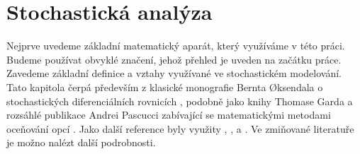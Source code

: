 \documentclass[a4paper,12pt]{report}
\theoremstyle{definition} \newtheorem{definice}[veta]{Definice}
\theoremstyle{remark}
\begin{document}

\chapter{Stochastická analýza}
Nejprve uvedeme základní matematický aparát, který využíváme v této práci.
Budeme používat obvyklé značení, jehož přehled je uveden na začátku práce. 
Zavedeme základní definice a vztahy využívané ve stochastickém modelování.
Tato kapitola čerpá především z klasické monografie Bernta {\O}ksendala o stochastických diferenciálních rovnicích \cite{oksendal2003stochastic}, 
podobně jako knihy Thomase Garda  \cite{gard} 
a rozsáhlé publikace Andrei Pascucci zabívající se matematickými metodami oceňování opcí \cite{pascucci}.
Jako další reference byly využity \cite{karatzas2012brownian}, \cite{allen2010introduction},  \cite{shreve2012stochastic} a \cite{shreve2004stochastic}.
Ve zmiňované literatuře je možno nalézt další podrobnosti.
\end{document}
